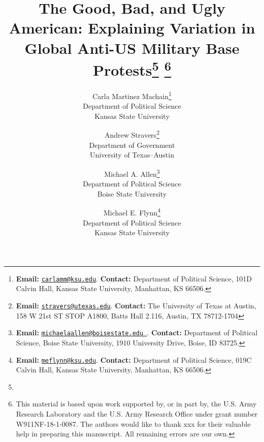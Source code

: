 \documentclass[12pt]{article}
\begin{document}
\title{The Good, Bad, and Ugly American: Explaining Variation in Global Anti-US Military Base Protests\footnote{} \thanks{This material is based upon work supported by, or in part by, the U.S. Army Research Laboratory and the U.S. Army Research Office under grant number W911NF-18-1-0087. The authors would like to thank xxx for their valuable help in preparing this manuscript. All remaining errors are our own.}}
\author{Carla Martinez Machain\thanks{\textbf{Email:} \href{mailto:carlamm@ksu.edu}{\tt carlamm@ksu.edu}. \textbf{Contact:} Department of Political Science, 101D Calvin Hall, Kansas State University, Manhattan, KS 66506.} \\
Department of Political Science \\
Kansas State University \\
\and Andrew Stravers\thanks{\textbf{Email:} \href{mailto:stravers@utexas.edu}{\tt stravers@utexas.edu}. \textbf{Contact:} The University of Texas at Austin, 158 W 21st ST STOP A1800, Batts Hall 2.116, Austin, TX 78712-1704}\\
Department of Government\\
University of Texas--Austin \\
\and
Michael A. Allen\thanks{\textbf{Email:} \href{mailto:michaelaallen@boisestate.edu }{\tt michaelaallen@boisestate.edu }. \textbf{Contact:} Department of Political Science, Boise State University, 1910 University Drive, Boise, ID 83725.}\\
Department of Political Science\\
Boise State University \\
\and
Michael E. Flynn\thanks{\textbf{Email:} \href{mailto:meflynn@ksu.edu}{\tt meflynn@ksu.edu}. \textbf{Contact:} Department of Political Science, 019C Calvin Hall, Kansas State University, Manhattan, KS 66506.}\\
Department of Political Science\\
Kansas State University
}

\maketitle
\thispagestyle{empty}


\clearpage
\end{document}
